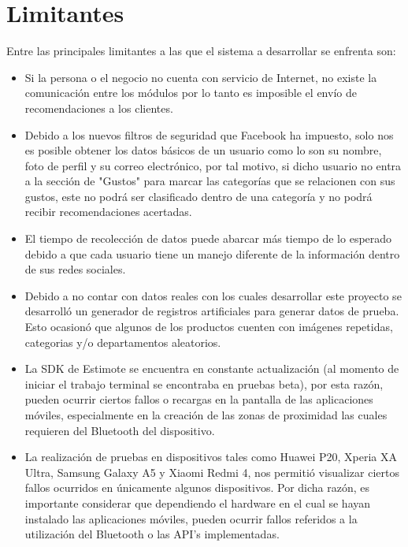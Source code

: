 \section{Limitantes}
Entre las principales limitantes a las que el sistema a desarrollar se enfrenta son: \\
\begin{itemize}
    \item Si la persona o el negocio no cuenta con servicio de Internet, no existe la comunicación entre los módulos por lo tanto es imposible el envío de recomendaciones a los clientes.
    \item Debido a los nuevos filtros de seguridad que Facebook ha impuesto, solo nos es posible obtener los datos básicos de un usuario como lo son su nombre, foto de perfil y su correo electrónico, por tal motivo, si dicho usuario no entra a la sección de "Gustos" para marcar las categorías que se relacionen con sus gustos, este no podrá ser clasificado dentro de una categoría y no podrá recibir recomendaciones acertadas.
    \item El tiempo de recolección de datos puede abarcar más tiempo de lo esperado debido a que cada usuario tiene un manejo diferente de la información dentro de sus redes sociales.
    \item Debido a no contar con datos reales con los cuales desarrollar este proyecto se desarrolló un generador de registros artificiales para generar datos de prueba. Esto ocasionó que algunos de los productos cuenten con imágenes repetidas, categorias y/o departamentos aleatorios.
    \item La SDK de Estimote se encuentra en constante actualización (al momento de iniciar el trabajo terminal se encontraba en pruebas beta), por esta razón, pueden ocurrir ciertos fallos o recargas en la pantalla de las aplicaciones móviles, especialmente en la creación de las zonas de proximidad las cuales requieren del Bluetooth del dispositivo.
    \item La realización de pruebas en dispositivos tales como Huawei P20, Xperia XA Ultra, Samsung Galaxy A5 y Xiaomi Redmi 4, nos permitió visualizar ciertos fallos ocurridos en únicamente algunos dispositivos. Por dicha razón, es importante considerar que dependiendo el hardware en el cual se hayan instalado las aplicaciones móviles, pueden ocurrir fallos referidos a la utilización del Bluetooth o las API's implementadas.
\end{itemize}
